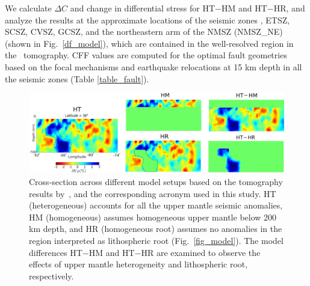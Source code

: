 \documentclass[draft,linenumbers]{agujournal2018}
\begin{document}
We calculate $\Delta C$ and change in differential stress for HT$-$HM and HT$-$HR, and analyze the results at the approximate locations of the seismic zones , ETSZ, SCSZ, CVSZ, GCSZ, and the northeastern arm of the NMSZ (NMSZ\_NE) (shown in Fig.~\ref{df_model}), which are contained in the well-resolved region in the~\citet{Biryol_2016} tomography. CFF values are computed for the optimal fault geometries based on the focal mechanisms and earthquake relocations at 15 km depth in all the seismic zones (Table \ref{table_fault}). 
%
\begin{figure}[h!]
    \centering
    \includegraphics[width=\linewidth]{figures/model_differences.png}
    \caption{Cross-section across different model setups based on the tomography results by~\citep{Biryol_2016}, and the corresponding acronym used in this study. HT (heterogeneous) accounts for all the upper mantle seismic anomalies, HM (homogeneous) assumes homogeneous upper mantle below 200 km depth, and HR (homogeneous root) assumes no anomalies in the region interpreted as lithospheric root (Fig.~\ref{fig_model}). The model differences HT$-$HM and HT$-$HR are examined to observe the effects of upper mantle heterogeneity and lithospheric root, respectively.}
    \label{model_differences}
\end{figure}
%
\end{document}
